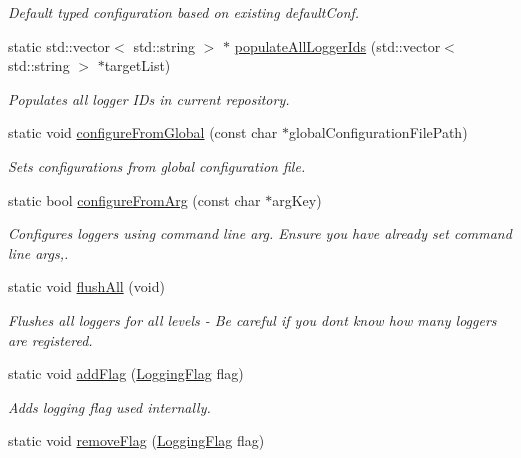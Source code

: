 \begin{DoxyCompactItemize}
\begin{DoxyCompactList}\small\item\em Default typed configuration based on existing default\+Conf. \end{DoxyCompactList}\item 
static std\+::vector$<$ std\+::string $>$ $\ast$ \hyperlink{a00049_adea07ec6cbc1dfc50f939d69dcac7160}{populate\+All\+Logger\+Ids} (std\+::vector$<$ std\+::string $>$ $\ast$target\+List)
\begin{DoxyCompactList}\small\item\em Populates all logger I\+Ds in current repository. \end{DoxyCompactList}\item 
\hypertarget{a00049_a9992995a85745639aa9aa5a2df2255f5}{}static void \hyperlink{a00049_a9992995a85745639aa9aa5a2df2255f5}{configure\+From\+Global} (const char $\ast$global\+Configuration\+File\+Path)\label{a00049_a9992995a85745639aa9aa5a2df2255f5}

\begin{DoxyCompactList}\small\item\em Sets configurations from global configuration file. \end{DoxyCompactList}\item 
static bool \hyperlink{a00049_a28acf6f2b1ea7e5edd1b2560cde82406}{configure\+From\+Arg} (const char $\ast$arg\+Key)
\begin{DoxyCompactList}\small\item\em Configures loggers using command line arg. Ensure you have already set command line args,. \end{DoxyCompactList}\item 
\hypertarget{a00049_a1834480e970c16817459ca3ee26b44b5}{}static void \hyperlink{a00049_a1834480e970c16817459ca3ee26b44b5}{flush\+All} (void)\label{a00049_a1834480e970c16817459ca3ee26b44b5}

\begin{DoxyCompactList}\small\item\em Flushes all loggers for all levels -\/ Be careful if you dont know how many loggers are registered. \end{DoxyCompactList}\item 
\hypertarget{a00049_aedd2de02dd701b0f20ddaa10f1f728f1}{}static void \hyperlink{a00049_aedd2de02dd701b0f20ddaa10f1f728f1}{add\+Flag} (\hyperlink{a00183_a2784aacd04cb7816ac1c0b20fcbf83cb}{Logging\+Flag} flag)\label{a00049_aedd2de02dd701b0f20ddaa10f1f728f1}

\begin{DoxyCompactList}\small\item\em Adds logging flag used internally. \end{DoxyCompactList}\item 
\hypertarget{a00049_a23fcb4b492f70a34285c45c0b5e2e515}{}static void \hyperlink{a00049_a23fcb4b492f70a34285c45c0b5e2e515}{remove\+Flag} (\hyperlink{a00183_a2784aacd04cb7816ac1c0b20fcbf83cb}{Logging\+Flag} flag)\label{a00049_a23fcb4b492f70a34285c45c0b5e2e515}


\end{DoxyCompactItemize}
